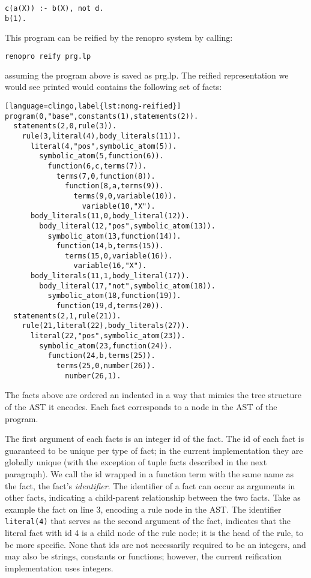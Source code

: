 \begin{lstlisting}[language=clingo]
c(a(X)) :- b(X), not d. 
b(1).
\end{lstlisting}

This program can be reified by the renopro system by calling:

\begin{lstlisting}[language=bash,numbers=none]
renopro reify prg.lp
\end{lstlisting}

assuming the program above is saved as prg.lp. The reified
representation we would see printed would contains the following set
of facts:

\begin{lstlisting}[language=clingo,label{lst:nong-reified}]
program(0,"base",constants(1),statements(2)).
  statements(2,0,rule(3)).
    rule(3,literal(4),body_literals(11)).
      literal(4,"pos",symbolic_atom(5)).
        symbolic_atom(5,function(6)).
          function(6,c,terms(7)).
            terms(7,0,function(8)).
              function(8,a,terms(9)).
                terms(9,0,variable(10)).
                  variable(10,"X").
      body_literals(11,0,body_literal(12)).
        body_literal(12,"pos",symbolic_atom(13)).
          symbolic_atom(13,function(14)).
            function(14,b,terms(15)).
              terms(15,0,variable(16)).
                variable(16,"X").
      body_literals(11,1,body_literal(17)).
        body_literal(17,"not",symbolic_atom(18)).
          symbolic_atom(18,function(19)).
            function(19,d,terms(20)).
  statements(2,1,rule(21)).
    rule(21,literal(22),body_literals(27)).
      literal(22,"pos",symbolic_atom(23)).
        symbolic_atom(23,function(24)).
          function(24,b,terms(25)).
            terms(25,0,number(26)).
              number(26,1).
\end{lstlisting}

The facts above are ordered an indented in a way that mimics the tree
structure of the AST it encodes. Each fact corresponds to a node in
the AST of the program. 

The first argument of each facts is an integer id of the fact. The id
of each fact is guaranteed to be unique per type of fact; in the
current implementation they are globally unique (with the exception of
tuple facts described in the next paragraph). We call the id wrapped
in a function term with the same name as the fact, the fact's
\emph{identifier}. The identifier of a fact can occur as arguments in
other facts, indicating a child-parent relationship between the two
facts.  Take as example the fact on line 3, encoding a rule node in
the AST. The identifier \texttt{literal(4)} that serves as the second
argument of the fact, indicates that the literal fact with id 4 is a
child node of the rule node; it is the head of the rule, to be more
specific. None that ids are not necessarily required to be an
integers, and may also be strings, constants or functions; however,
the current reification implementation uses integers.

